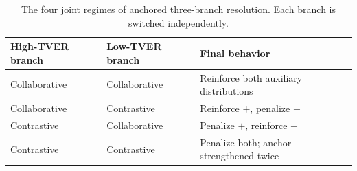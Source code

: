 \begin{table}[t]
\centering
\small
\setlength{\tabcolsep}{4pt}
\begin{tabular}{lll}
\toprule
High-TVER branch & Low-TVER branch & Final behavior \\
\midrule
Collaborative & Collaborative & Reinforce both auxiliary distributions \\
Collaborative & Contrastive   & Reinforce $+$, penalize $-$ \\
Contrastive   & Collaborative & Penalize $+$, reinforce $-$ \\
Contrastive   & Contrastive   & Penalize both; anchor strengthened twice \\
\bottomrule
\end{tabular}
\caption{The four joint regimes of anchored three-branch resolution. Each branch is switched independently.}
\label{tab:regimes}
\end{table}

